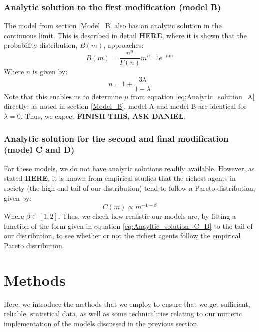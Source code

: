 \documentclass[a4paper, 10pt]{article}
\begin{document}
\subsubsection{Analytic solution to the first modification (model B)}
The model from section \ref{Model_B} also has an analytic solution in the continuous limit. This is described in detail \textbf{HERE}, where it is shown that the probability distribution, $B(m)$, approaches:
\begin{equation}
B(m)=\frac{n^n}{\Gamma(n)}m^{n-1}e^{-nm}
\end{equation}
Where $n$ is given by:
$$n=1+\frac{3\lambda}{1-\lambda}$$
Note that this enables us to determine $\mu$ from equation \ref{eq:Analytic_solution_A} directly; as noted in section \ref{Model_B}, model A and model B are identical for $\lambda = 0$. Thus, we expect \textbf{FINISH THIS, ASK DANIEL}.
\subsubsection{Analytic solution for the second and final modification (model C and D)}
For these models, we do not have analytic solutions readily available. However, as stated \textbf{HERE}, it is known from empirical studies that the richest agents in society (the high-end tail of our distribution) tend to follow a Pareto distribution, given by:
\begin{equation}\label{eq:Anayltic_solution_C_D}
C(m) \propto m^{-1-\beta}
\end{equation}
Where $\beta \in [1,2]$. Thus, we check how realistic our models are, by fitting a function of the form given in equation \ref{eq:Anayltic_solution_C_D} to the tail of our distribution, to see whether or not the richest agents follow the empirical Pareto distribution.
\section{Methods}\label{Method_section}
Here, we introduce the methods that we employ to ensure that we get sufficient, reliable, statistical data, as well as some technicalities relating to our numeric implementation of the models discussed in the previous section.
\end{document}
